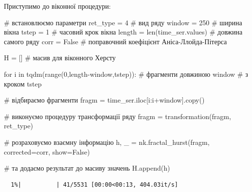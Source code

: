 \documentclass[
  letterpaper,
]{report}
\newenvironment{Shaded}{\begin{snugshade}}{\end{snugshade}}
\newcommand{\BuiltInTok}[1]{\textcolor[rgb]{0.00,0.23,0.31}{#1}}
\newcommand{\CommentTok}[1]{\textcolor[rgb]{0.37,0.37,0.37}{#1}}
\newcommand{\ControlFlowTok}[1]{\textcolor[rgb]{0.00,0.23,0.31}{#1}}
\newcommand{\DecValTok}[1]{\textcolor[rgb]{0.68,0.00,0.00}{#1}}
\newcommand{\KeywordTok}[1]{\textcolor[rgb]{0.00,0.23,0.31}{#1}}
\newcommand{\NormalTok}[1]{\textcolor[rgb]{0.00,0.23,0.31}{#1}}
\newcommand{\OperatorTok}[1]{\textcolor[rgb]{0.37,0.37,0.37}{#1}}
\newcommand{\VariableTok}[1]{\textcolor[rgb]{0.07,0.07,0.07}{#1}}
\begin{document}
Приступимо до віконної процедури:

\begin{Shaded}
\begin{Highlighting}[]
\CommentTok{\# встановлюємо параметри}
\NormalTok{ret\_type }\OperatorTok{=} \DecValTok{4}                   \CommentTok{\# вид ряду}
\NormalTok{window }\OperatorTok{=} \DecValTok{250}                   \CommentTok{\# ширина вікна}
\NormalTok{tstep }\OperatorTok{=} \DecValTok{1}                      \CommentTok{\# часовий крок вікна }
\NormalTok{length }\OperatorTok{=} \BuiltInTok{len}\NormalTok{(time\_ser.values)  }\CommentTok{\# довжина самого ряду}
\NormalTok{corr }\OperatorTok{=} \VariableTok{False}                   \CommentTok{\# поправочний коефіцієнт Аніса{-}Ллойда{-}Пітерса}

\NormalTok{H }\OperatorTok{=}\NormalTok{ []                         }\CommentTok{\# масив для віконного Херсту}
\end{Highlighting}
\end{Shaded}

\begin{Shaded}
\begin{Highlighting}[]
\ControlFlowTok{for}\NormalTok{ i }\KeywordTok{in}\NormalTok{ tqdm(}\BuiltInTok{range}\NormalTok{(}\DecValTok{0}\NormalTok{,length}\OperatorTok{{-}}\NormalTok{window,tstep)): }\CommentTok{\# фрагменти довжиною window  }
                                             \CommentTok{\# з кроком tstep}

    \CommentTok{\# відбираємо фрагменти}
\NormalTok{    fragm }\OperatorTok{=}\NormalTok{ time\_ser.iloc[i:i}\OperatorTok{+}\NormalTok{window].copy()  }

    \CommentTok{\# виконуємо процедуру трансформації ряду }
\NormalTok{    fragm }\OperatorTok{=}\NormalTok{ transformation(fragm, ret\_type)}

    \CommentTok{\# розраховуємо взаємну інформацію }
\NormalTok{    h, \_ }\OperatorTok{=}\NormalTok{ nk.fractal\_hurst(fragm, corrected}\OperatorTok{=}\NormalTok{corr, show}\OperatorTok{=}\VariableTok{False}\NormalTok{)}
    
    \CommentTok{\# та додаємо результат до масиву значень}
\NormalTok{    H.append(h)}
\end{Highlighting}
\end{Shaded}

\begin{verbatim}
  1%|          | 41/5531 [00:00<00:13, 404.03it/s]
\end{verbatim}
\end{document}
